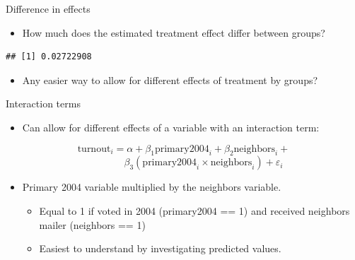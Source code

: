 \documentclass[
  ignorenonframetext,
]{beamer}
\newenvironment{Shaded}{\begin{snugshade}}{\end{snugshade}}
\newcommand{\NormalTok}[1]{#1}
\newcommand{\SpecialCharTok}[1]{\textcolor[rgb]{0.81,0.36,0.00}{\textbf{#1}}}
\providecommand{\tightlist}{%
  \setlength{\itemsep}{0pt}\setlength{\parskip}{0pt}}
\begin{document}
\begin{frame}[fragile]{Difference in effects}
\label{difference-in-effects}
\begin{itemize}
\tightlist
\item
  How much does the estimated treatment effect differ between groups?
  \pause
\end{itemize}

\begin{Shaded}
\end{Shaded}

\begin{verbatim}
## [1] 0.02722908
\end{verbatim}

\pause

\begin{itemize}
\tightlist
\item
  Any easier way to allow for different effects of treatment by groups?
\end{itemize}
\end{frame}

\begin{frame}{Interaction terms}
\label{interaction-terms}
\pause

\begin{itemize}
\tightlist
\item
  Can allow for different effects of a variable with an interaction
  term: \pause
\end{itemize}

\[
\text{turnout}_i = \alpha + \beta_1\text{primary2004}_i + \beta_2\text{neighbors}_i + 
\] \[
\qquad \qquad \beta_3(\text{primary2004}_i \times \text{neighbors}_i) + \varepsilon_i
\]

\pause

\begin{itemize}
\tightlist
\item
  Primary 2004 variable multiplied by the neighbors variable.

  \begin{itemize}
  \tightlist
  \item
    Equal to 1 if voted in 2004 (primary2004 == 1) and received
    neighbors mailer (neighbors == 1) \pause
  \item
    Easiest to understand by investigating predicted values.
  \end{itemize}
\end{itemize}
\end{frame}
\end{document}
